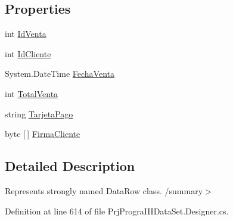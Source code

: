 \subsection*{Properties}
\begin{DoxyCompactItemize}
\item 
int \hyperlink{classprj_progra_i_i_i_1_1_prj_progra_i_i_i_data_set_1_1rpt___get_sales_by_day_row_abb6e907f6cc9632844eba49d8cd7d8de}{Id\+Venta}
\item 
int \hyperlink{classprj_progra_i_i_i_1_1_prj_progra_i_i_i_data_set_1_1rpt___get_sales_by_day_row_abb9d1585914243612188a9ecb4f0713e}{Id\+Cliente}
\item 
System.\+Date\+Time \hyperlink{classprj_progra_i_i_i_1_1_prj_progra_i_i_i_data_set_1_1rpt___get_sales_by_day_row_ad1ccc1bb82e8683536df128349e13d1e}{Fecha\+Venta}
\item 
int \hyperlink{classprj_progra_i_i_i_1_1_prj_progra_i_i_i_data_set_1_1rpt___get_sales_by_day_row_a12016acaca3c3eec09d339f2922e1405}{Total\+Venta}
\item 
string \hyperlink{classprj_progra_i_i_i_1_1_prj_progra_i_i_i_data_set_1_1rpt___get_sales_by_day_row_adce0d9f03adf2cf633a590ab40f83e92}{Tarjeta\+Pago}
\item 
byte \mbox{[}$\,$\mbox{]} \hyperlink{classprj_progra_i_i_i_1_1_prj_progra_i_i_i_data_set_1_1rpt___get_sales_by_day_row_a38d232ab21c71f20006a148b85e487fb}{Firma\+Cliente}
\end{DoxyCompactItemize}


\subsection{Detailed Description}
Represents strongly named Data\+Row class. /summary$>$ 

Definition at line 614 of file Prj\+Progra\+I\+I\+I\+Data\+Set.\+Designer.\+cs.



